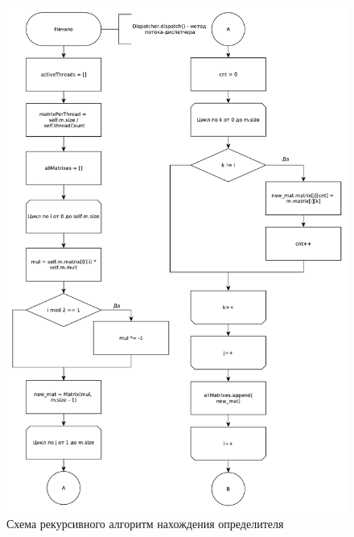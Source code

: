 \documentclass[a4paper,oneside,14pt]{extreport}
\begin{document}
\begin{figure}[H]
	\centering
	\includegraphics[width=0.85\linewidth]{images/solver_part_1}
	\caption{Схема рекурсивного алгоритм нахождения определителя}
	\label{img:solver_1}
\end{figure}
\end{document}
